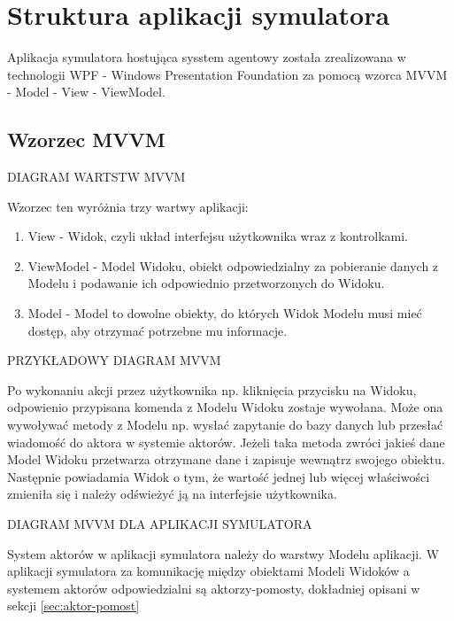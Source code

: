 \section{Struktura aplikacji symulatora}
Aplikacja symulatora hostująca sysstem agentowy została zrealizowana w technologii WPF - Windows Presentation Foundation za pomocą wzorca MVVM - Model - View - ViewModel.
\subsection{Wzorzec MVVM}
DIAGRAM WARTSTW MVVM
% 

Wzorzec ten wyróżnia trzy wartwy aplikacji:
\begin{enumerate}
    \item View - Widok, czyli układ interfejsu użytkownika wraz z kontrolkami. 
    \item ViewModel - Model Widoku, obiekt odpowiedzialny za pobieranie danych z Modelu i podawanie ich odpowiednio przetworzonych do Widoku. 
    \item Model - Model to dowolne obiekty, do których Widok Modelu musi mieć dostęp, aby otrzymać potrzebne mu informacje. 
\end{enumerate}

PRZYKŁADOWY DIAGRAM MVVM
% 

Po wykonaniu akcji przez użytkownika np. kliknięcia przycisku na Widoku, odpowienio przypisana komenda z Modelu Widoku zostaje wywołana. 
Może ona wywoływać metody z Modelu np. wysłać zapytanie do bazy danych lub przesłać wiadomość do aktora w systemie aktorów.
Jeżeli taka metoda zwróci jakieś dane Model Widoku przetwarza otrzymane dane i zapisuje wewnątrz swojego obiektu. 
Następnie powiadamia Widok o tym, że wartość jednej lub więcej właściwości zmieniła się i należy odświeżyć ją na interfejsie użytkownika.

DIAGRAM MVVM DLA APLIKACJI SYMULATORA
% 

System aktorów w aplikacji symulatora należy do warstwy Modelu aplikacji.
W aplikacji symulatora za komunikację między obiektami Modeli Widoków a systemem aktorów odpowiedzialni są aktorzy-pomosty, dokładniej opisani w sekcji \ref{sec:aktor-pomost}
